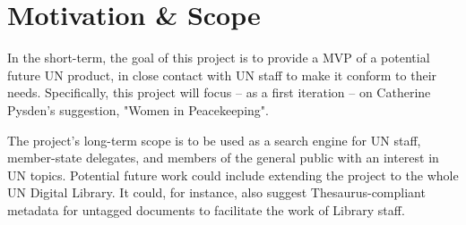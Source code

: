 
\section{Motivation \& Scope} \label{sec:motivation-scope}

In the short-term, the goal of this project is to provide a MVP of a potential future UN product, in close contact with UN staff to make it conform to their needs. Specifically, this project will focus – as a first iteration – on Catherine Pysden's suggestion, "Women in Peacekeeping".

The project's long-term scope is to be used as a search engine for UN staff, member-state delegates, and members of the general public with an interest in UN topics. Potential future work could include extending the project to the whole UN Digital Library. It could, for instance, also suggest Thesaurus-compliant metadata for untagged documents to facilitate the work of Library staff.